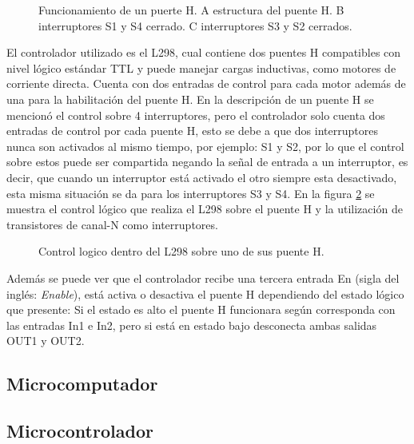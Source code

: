 \documentclass{iccmemoria}
\begin{document}
\begin{figure}[H]
  \centering
  
  \caption{Funcionamiento de un puerte H. A estructura del puente H. B interruptores S1 y S4 cerrado. C interruptores S3 y S2 cerrados.}
  \label{fig:H bridge}
\end{figure}

El controlador utilizado es el L298, cual contiene dos puentes H compatibles con nivel lógico estándar TTL y puede manejar cargas inductivas, como motores de corriente directa. Cuenta con dos entradas de control para cada motor además de una para la habilitación del puente H. En la descripción de un puente H se mencionó el control sobre 4 interruptores, pero el controlador solo cuenta dos entradas de control por cada puente H, esto se debe a que dos interruptores nunca son activados al mismo tiempo, por ejemplo: S1 y S2, por lo que el control sobre estos puede ser compartida negando la señal de entrada a un interruptor, es decir, que cuando un interruptor está activado el otro siempre esta desactivado, esta misma situación se da para los interruptores S3 y S4. En la figura \ref{fig:H bridge circuit} se muestra el control lógico que realiza el L298 sobre el puente H y la utilización de transistores de canal-N  como interruptores.\\

\begin{figure}[H]
  \centering
  \selectfont{
  
  }
  \caption{Control logico dentro del L298 sobre uno de sus puente H.}
  \label{fig:H bridge circuit}
\end{figure}

Además se puede ver que el controlador recibe una tercera entrada En (sigla del inglés: \emph{Enable}), está activa o desactiva el puente H dependiendo del estado lógico que presente: Si el estado es alto el puente H funcionara según corresponda con las entradas In1 e In2, pero si está en estado bajo desconecta ambas salidas OUT1 y OUT2.

\subsection{Microcomputador}

\subsection{Microcontrolador}
\end{document}
